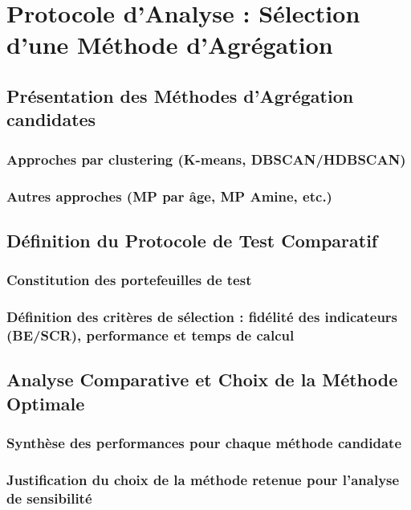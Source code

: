 \chapter{Protocole d'Analyse : Sélection d'une Méthode d'Agrégation}

\section{Présentation des Méthodes d'Agrégation candidates}
    \subsection{Approches par clustering (K-means, DBSCAN/HDBSCAN)}
    \subsection{Autres approches (MP par âge, MP Amine, etc.)}

\section{Définition du Protocole de Test Comparatif}
    \subsection{Constitution des portefeuilles de test}
    \subsection{Définition des critères de sélection : fidélité des indicateurs (BE/SCR), performance et temps de calcul}

\section{Analyse Comparative et Choix de la Méthode Optimale}
    \subsection{Synthèse des performances pour chaque méthode candidate}
    \subsection{Justification du choix de la méthode retenue pour l'analyse de sensibilité}

